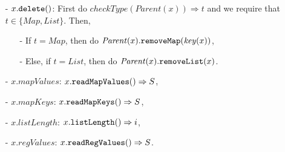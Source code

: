 \begin{itemize}
\item[-] $x.{\tt delete}()$: First do $\mathit{checkType}(\mathit{Parent}(x))\Rightarrow t$ and we require that $t \in \{ \mathit{Map}, \mathit{List} \}$. Then,

    \begin{itemize}
    \setlength{\itemsep}{0.5pt}
    \item[-] If $t = \mathit{Map}$, then do $\mathit{Parent}(x).{\tt removeMap}( \mathit{key}(x) )$,

    \item[-] Else, if $t = \mathit{List}$, then do $\mathit{Parent}(x).{\tt removeList}(x)$.
    \end{itemize}

\item[-] $x.\mathit{mapValues}$: $x.{\tt readMapValues}()\Rightarrow S$,

\item[-] $x.\mathit{mapKeys}$: $x.{\tt readMapKeys}()\Rightarrow S$,

\item[-] $x.\mathit{listLength}$: $x.{\tt listLength}()\Rightarrow i$,

\item[-] $x.\mathit{regValues}$: $x.{\tt readRegValues}()\Rightarrow S$.
\end{itemize}


